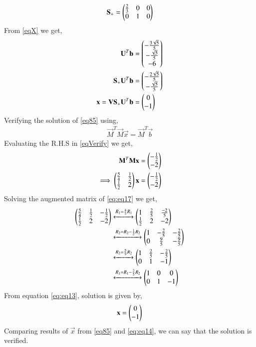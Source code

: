 \documentclass[journal,12pt,twocolumn]{IEEEtran}
\begin{document}
\begin{align}
\mathbf{S_+} = \begin{pmatrix}\frac{2}{3}&0&0\\0&1&0\end{pmatrix}
\end{align}
From \eqref{eqX} we get,
\begin{align}
\mathbf{U}^T\mathbf{b}&=\begin{pmatrix}-\frac{3\sqrt{5}}{5}\\-\frac{\sqrt{5}}{5}\\-6\end{pmatrix}\\
\mathbf{S_+}\mathbf{U}^T\mathbf{b}&=\begin{pmatrix}-\frac{2\sqrt{5}}{5}\\-\frac{\sqrt{5}}{5}\end{pmatrix}\\
\mathbf{x} = \mathbf{V}\mathbf{S_+}\mathbf{U}^T\mathbf{b} &= \begin{pmatrix}0\\-1\end{pmatrix}\label{eq85}
\end{align}
Verifying the solution of \eqref{eq85} using,
\begin{align}
\vec{M}^T\vec{M}\vec{x} = \vec{M}^T\vec{b}\label{eqVerify}
\end{align}
Evaluating the R.H.S in \eqref{eqVerify} we get,
\begin{align}
\mathbf{M}^T\mathbf{M}\mathbf{x} &= \begin{pmatrix}-\frac{1}{2}\\-2\end{pmatrix}\\
\implies\begin{pmatrix}\frac{5}{4}&\frac{1}{2}\\\frac{1}{2}&2\end{pmatrix}\mathbf{x} &= \begin{pmatrix}-\frac{1}{2}\\{-2}\end{pmatrix}\label{eq:eq17}
\end{align}
Solving the augmented matrix of \eqref{eq:eq17} we get,
\begin{align}
\begin{pmatrix}\frac{5}{4}&\frac{1}{2}&-\frac{1}{2}\\\frac{1}{2}&2&-2\end{pmatrix} &\xleftrightarrow{R_1=\frac{4}{5}R_1}\begin{pmatrix}1&\frac{2}{5}&\frac{-2}{5}\\\frac{1}{2}&2&-2\end{pmatrix}\\
&\xleftrightarrow{R_2=R_2-\frac{1}{2}R_2}\begin{pmatrix}1&-\frac{2}{5}&-\frac{2}{5}\\0&\frac{9}{5}&-\frac{9}{5}\end{pmatrix}\\
&\xleftrightarrow{R_2=\frac{5}{9}R_2}\begin{pmatrix}1&\frac{2}{5}&-\frac{2}{5}\\0&1&-1\end{pmatrix}\\
&\xleftrightarrow{R_1=R_1-\frac{2}{5}R_2}\begin{pmatrix}1&0&0\\0&1&-1\end{pmatrix}\label{eq:eq13}
\end{align}
From equation \eqref{eq:eq13}, solution is given by,
\begin{align}
\mathbf{x}=\begin{pmatrix}0\\-1\end{pmatrix}\label{eq:eq14}
\end{align}
Comparing results of $\vec{x}$ from \eqref{eq85} and \eqref{eq:eq14}, we can say that the solution is verified.
\end{document}
